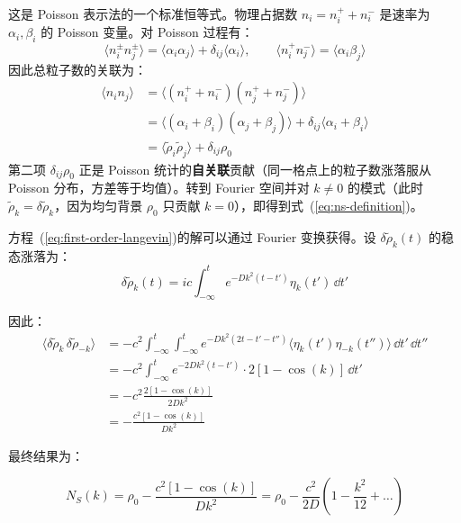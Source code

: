\begin{remark}
这是 Poisson 表示法的一个标准恒等式。物理占据数 $n_i = n_i^+ + n_i^-$ 是速率为 $\alpha_i, \beta_i$ 的 Poisson 变量。对 Poisson 过程有：
\[
\langle n_i^\pm n_j^\pm \rangle = \langle \alpha_i \alpha_j \rangle + \delta_{ij}\langle \alpha_i \rangle, \qquad
\langle n_i^+ n_j^- \rangle = \langle \alpha_i \beta_j \rangle
\]
因此总粒子数的关联为：
\begin{align*}
\langle n_i n_j \rangle
&= \langle (n_i^+ + n_i^-)(n_j^+ + n_j^-) \rangle \\
&= \langle (\alpha_i + \beta_i)(\alpha_j + \beta_j) \rangle + \delta_{ij}\langle \alpha_i + \beta_i \rangle \\
&= \langle \tilde{\rho}_i \tilde{\rho}_j \rangle + \delta_{ij}\rho_0
\end{align*}
第二项 $\delta_{ij}\rho_0$ 正是 Poisson 统计的\textbf{自关联}贡献（同一格点上的粒子数涨落服从 Poisson 分布，方差等于均值）。转到 Fourier 空间并对 $k \neq 0$ 的模式（此时 $\tilde{\rho}_k = \delta\tilde{\rho}_k$，因为均匀背景 $\rho_0$ 只贡献 $k=0$），即得到式~(\ref{eq:ns-definition})。
\end{remark}

\begin{derivation}[结构因子的详细计算]
方程~(\ref{eq:first-order-langevin})的解可以通过 Fourier 变换获得。设 $\delta\tilde{\rho}_k(t)$ 的稳态涨落为：
\[
\delta\tilde{\rho}_k(t) = ic \int_{-\infty}^{t} e^{-Dk^2(t-t')}\eta_k(t')\,\dd t'
\]

因此：
\begin{align}
\langle \delta\tilde{\rho}_k \, \delta\tilde{\rho}_{-k} \rangle &= -c^2 \int_{-\infty}^{t}\int_{-\infty}^{t} e^{-Dk^2(2t - t' - t'')} \langle \eta_k(t')\eta_{-k}(t'') \rangle \, \dd t' \, \dd t'' \nonumber\\
&= -c^2 \int_{-\infty}^{t} e^{-2Dk^2(t-t')} \cdot 2[1 - \cos(k)] \, \dd t' \nonumber\\
&= -c^2 \frac{2[1 - \cos(k)]}{2Dk^2} \nonumber\\
&= -\frac{c^2[1 - \cos(k)]}{Dk^2}\nonumber
\end{align}
\end{derivation}

最终结果为：
\begin{resultbox}
\begin{equation}\label{eq:structure-factor-final}
\boxed{N_S(k) = \rho_0 - \frac{c^2[1 - \cos(k)]}{Dk^2} = \rho_0 - \frac{c^2}{2D}\left(1 - \frac{k^2}{12} + \ldots\right)}
\end{equation}
\end{resultbox}

